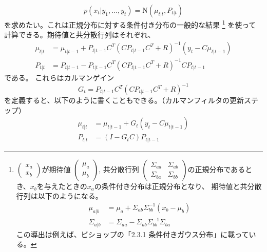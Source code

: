 \documentclass[textwidth-limit=45]{bxjsarticle}
\begin{document}
\begin{equation}
  p(x_{t}|y_1, \dots, y_{t}) = \mathrm N(\mu_{t|t}, P_{t|t})
\end{equation}
を求めたい。これは正規分布に対する条件付き分布の一般的な結果
\footnote{
  $\begin{pmatrix}
    x_{a} \\
    x_{b}
  \end{pmatrix}
  $が期待値
  $\begin{pmatrix}
    \mu_{a} \\
    \mu_{b}
  \end{pmatrix}
  $, 共分散行列
  $\begin{pmatrix}
    \Sigma_{aa} & \Sigma_{ab} \\
    \Sigma_{ba} & \Sigma_{bb}
  \end{pmatrix}
  $の正規分布であるとき、$x_b$を与えたときの$x_a$の条件付き分布は正規分布となり、
  期待値と共分散行列は以下のようになる。
  \begin{align}
    \mu_{a|b} &= \mu_{a} + \Sigma_{ab} \Sigma_{bb}^{-1} (x_b - \mu_{b}) \\
    \Sigma_{a|b} &= \Sigma_{aa} - \Sigma_{ab} \Sigma_{bb}^{-1} \Sigma_{ba}
  \end{align}
  この導出は例えば、ビショップの「2.3.1 条件付きガウス分布」に載っている。
}
を使って計算できる。期待値と共分散行列はそれぞれ、
\begin{align}
  \mu_{t|t} &= \mu_{t|t-1} + P_{t|t-1}C^T (C P_{t|t-1} C^T + R)^{-1} (y_t - C\mu_{t|t-1})  \\
  P_{t|t} &= P_{t|t-1} - P_{t|t-1} C^T (C P_{t|t-1} C^T + R)^{-1} C P_{t|t-1}
\end{align}
である。
これらはカルマンゲイン
\begin{equation}
  G_t = P_{t|t-1} C^T (C P_{t|t-1} C^T + R)^{-1}
\end{equation}
を定義すると、以下のように書くこともできる。（カルマンフィルタの更新ステップ）
\begin{align}
  \mu_{t|t} &= \mu_{t|t-1} + G_t (y_t - C\mu_{t|t-1})  \\
  P_{t|t} &= (I- G_t C) P_{t|t-1}
\end{align}
\end{document}
